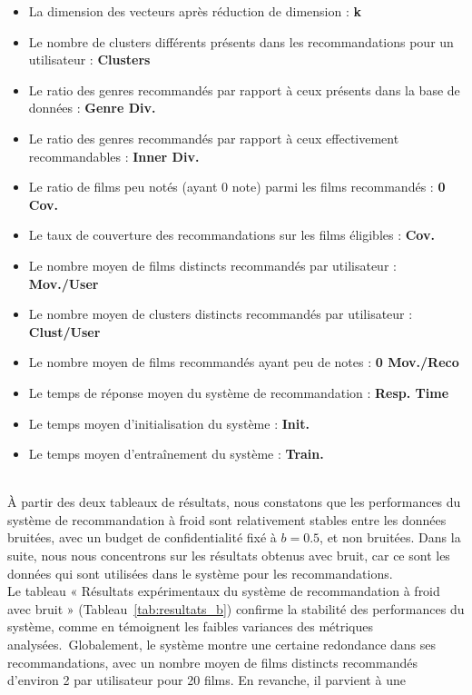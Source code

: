 \documentclass{article}
\begin{document}
    \begin{itemize}
    \item La dimension des vecteurs après réduction de dimension : \textbf{k}
    \item Le nombre de clusters différents présents dans les recommandations pour un utilisateur : \textbf{Clusters}
    \item Le ratio des genres recommandés par rapport à ceux présents dans la base de données : \textbf{Genre Div.}
    \item Le ratio des genres recommandés par rapport à ceux effectivement recommandables : \textbf{Inner Div.}
    \item Le ratio de films peu notés (ayant 0 note) parmi les films recommandés : \textbf{0 Cov.}
    \item Le taux de couverture des recommandations sur les films éligibles : \textbf{Cov.}
    \item Le nombre moyen de films distincts recommandés par utilisateur : \textbf{Mov./User}
    \item Le nombre moyen de clusters distincts recommandés par utilisateur : \textbf{Clust/User}
    \item Le nombre moyen de films recommandés ayant peu de notes : \textbf{0 Mov./Reco}
    \item Le temps de réponse moyen du système de recommandation : \textbf{Resp. Time}
    \item Le temps moyen d’initialisation du système : \textbf{Init.}
    \item Le temps moyen d’entraînement du système : \textbf{Train.}
    \end{itemize}
    $ $\\
    À partir des deux tableaux de résultats, nous constatons que les performances du système 
    de recommandation à froid sont relativement stables entre les données bruitées, avec un budget de confidentialité fixé à $b = 0.5$, et non bruitées. Dans 
    la suite, nous nous concentrons sur les résultats obtenus avec bruit, car ce sont les données qui 
    sont utilisées dans le système pour les recommandations.\\
    Le tableau « Résultats expérimentaux du système de recommandation à froid avec bruit » (Tableau~\ref{tab:resultats_b}) confirme la stabilité des performances 
    du système, comme en témoignent les faibles variances des métriques analysées.\
    Globalement, le système montre une certaine redondance dans ses recommandations, avec un nombre moyen de films 
    distincts recommandés d’environ 2 par utilisateur pour 20 films. En revanche, il parvient à une  
\end{document}
